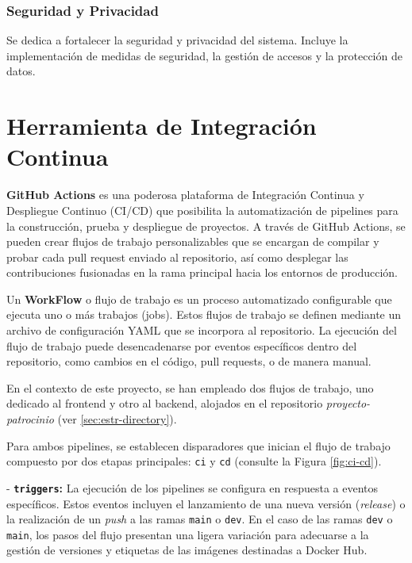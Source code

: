 \subsubsection{Seguridad y Privacidad}
Se dedica a fortalecer la seguridad y privacidad del sistema. Incluye la implementación de medidas de seguridad, la gestión de accesos y la protección de datos.



\section{Herramienta de Integración Continua}

\textbf{GitHub Actions} es una poderosa plataforma de Integración Continua y Despliegue Continuo (CI/CD) que posibilita la automatización de pipelines para la construcción, prueba y despliegue de proyectos. A través de GitHub Actions, se pueden crear flujos de trabajo personalizables que se encargan de compilar y probar cada pull request enviado al repositorio, así como desplegar las contribuciones fusionadas en la rama principal hacia los entornos de producción.

Un \textbf{WorkFlow} o flujo de trabajo es un proceso automatizado configurable que ejecuta uno o más trabajos (jobs). Estos flujos de trabajo se definen mediante un archivo de configuración YAML que se incorpora al repositorio. La ejecución del flujo de trabajo puede desencadenarse por eventos específicos dentro del repositorio, como cambios en el código, pull requests, o de manera manual.

En el contexto de este proyecto, se han empleado dos flujos de trabajo, uno dedicado al frontend y otro al backend, alojados en el repositorio \textit{proyecto-patrocinio} (ver \ref{sec:estr-directory}).

Para ambos pipelines, se establecen disparadores que inician el flujo de trabajo compuesto por dos etapas principales: \texttt{ci} y \texttt{cd} (consulte la Figura \ref{fig:ci-cd}).

- \textbf{\texttt{triggers}:} La ejecución de los pipelines se configura en respuesta a eventos específicos. Estos eventos incluyen el lanzamiento de una nueva versión (\textit{release}) o la realización de un \textit{push} a las ramas \texttt{main} o \texttt{dev}. En el caso de las ramas \texttt{dev} o \texttt{main}, los pasos del flujo presentan una ligera variación para adecuarse a la gestión de versiones y etiquetas de las imágenes destinadas a Docker Hub.

